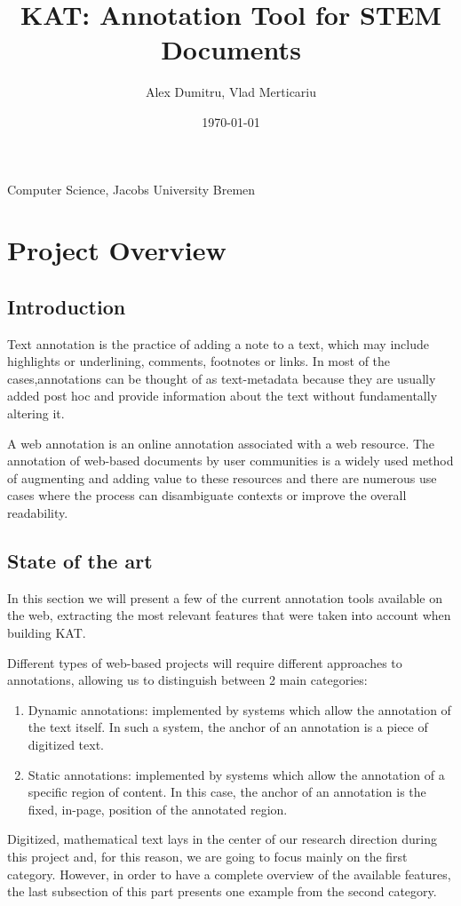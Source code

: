 \documentclass[a4paper, 12pt, notitlepage]{report}
\title{KAT: Annotation Tool for STEM Documents} %
\author{Alex Dumitru, Vlad Merticariu} %
\date{\today} %
\begin{document}
\maketitle
\begin{center}
Computer Science,  Jacobs University Bremen %
\\[12pt]
\end{center}
\thispagestyle{empty}
\newpage

\tableofcontents



\chapter{Project Overview}
%

\section{Introduction}\label{sec:intro}
Text annotation is the practice of adding a note to a text, which may include highlights
or underlining, comments, footnotes or links.  In most of the cases,annotations can be
thought of as text-metadata because they are usually added post hoc and provide
information about the text without fundamentally altering it.

A web annotation is an online annotation associated with a web resource. The annotation of
web-based documents by user communities is a widely used method of augmenting and adding
value to these resources and there are numerous use cases where the process can
disambiguate contexts or improve the overall readability.
\section{State of the art}
In this section we will present a few of the current annotation tools available on the web, extracting the most relevant features that were taken into account when building KAT.

Different types of web-based projects will
require different approaches to annotations, allowing us to distinguish between 2 main categories:
\begin{enumerate}
 \item Dynamic annotations: implemented by systems which allow the annotation of the text itself. In such a system, the anchor of an annotation is a piece of digitized text.
 \item Static annotations: implemented by systems which allow the annotation of a specific region of content. In this case, the anchor of an annotation is the fixed, in-page, position of
 the annotated region.
\end{enumerate}
Digitized, mathematical text lays in the center of our research direction during this project and, for this reason, we are going to focus mainly on the first category. However, in order to
have a complete overview of the available features, the last subsection of this part presents one example from the second category.
\end{document}
